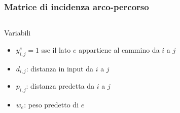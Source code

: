 \begin{frame}
    \frametitle{Matrice di incidenza arco-percorso}
    \begin{columns}
        \begin{column}{0.48\textwidth}
            \begin{block}{Variabili}
                \begin{itemize}
                    \item
                          $y_{i,j}^{e} =1$ sse il lato $e$ appartiene al cammino
                          da  $i$ a $j$
                    \item
                          $d_{i,j}$: distanza in input da  $i$ a $j$
                    \item
                          $p_{i,j}$: distanza predetta da  $i$ a $j$
                    \item
                          $w_{e}$: peso predetto di $e$
                \end{itemize}
            \end{block}
        \end{column}
    \end{columns}
\end{frame}

